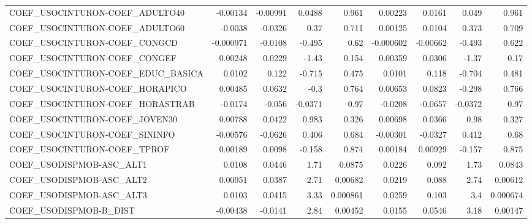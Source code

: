 \begin{tabular}{lrrrrrrrr}
COEF\_USOCINTURON-COEF\_ADULTO40    &    -0.00134 &     -0.00991 &   0.0488 &    0.961 &    0.00223 &      0.0161 &        0.049 &         0.961 \\
COEF\_USOCINTURON-COEF\_ADULTO60    &     -0.0038 &      -0.0326 &     0.37 &    0.711 &    0.00125 &      0.0104 &        0.373 &         0.709 \\
COEF\_USOCINTURON-COEF\_CONGCD      &   -0.000971 &      -0.0108 &   -0.495 &     0.62 &  -0.000602 &    -0.00662 &       -0.493 &         0.622 \\
COEF\_USOCINTURON-COEF\_CONGEF      &     0.00248 &       0.0229 &    -1.43 &    0.154 &    0.00359 &      0.0306 &        -1.37 &          0.17 \\
COEF\_USOCINTURON-COEF\_EDUC\_BASICA &      0.0102 &        0.122 &   -0.715 &    0.475 &     0.0101 &       0.118 &       -0.704 &         0.481 \\
COEF\_USOCINTURON-COEF\_HORAPICO    &     0.00485 &       0.0632 &     -0.3 &    0.764 &    0.00653 &      0.0823 &       -0.298 &         0.766 \\
COEF\_USOCINTURON-COEF\_HORASTRAB   &     -0.0174 &       -0.056 &  -0.0371 &     0.97 &    -0.0208 &     -0.0657 &      -0.0372 &          0.97 \\
COEF\_USOCINTURON-COEF\_JOVEN30     &     0.00788 &       0.0422 &    0.983 &    0.326 &    0.00698 &      0.0366 &         0.98 &         0.327 \\
COEF\_USOCINTURON-COEF\_SININFO     &    -0.00576 &      -0.0626 &    0.406 &    0.684 &   -0.00301 &     -0.0327 &        0.412 &          0.68 \\
COEF\_USOCINTURON-COEF\_TPROF       &     0.00189 &       0.0098 &   -0.158 &    0.874 &    0.00184 &     0.00929 &       -0.157 &         0.875 \\
COEF\_USODISPMOB-ASC\_ALT1          &      0.0108 &       0.0446 &     1.71 &   0.0875 &     0.0226 &       0.092 &         1.73 &        0.0843 \\
COEF\_USODISPMOB-ASC\_ALT2          &     0.00951 &       0.0387 &     2.71 &  0.00682 &     0.0219 &       0.088 &         2.74 &       0.00612 \\
COEF\_USODISPMOB-ASC\_ALT3          &      0.0103 &       0.0415 &     3.33 & 0.000861 &     0.0259 &       0.103 &          3.4 &      0.000674 \\
COEF\_USODISPMOB-B\_DIST            &    -0.00438 &      -0.0141 &     2.84 &  0.00452 &     0.0155 &      0.0546 &         3.18 &       0.00147 \\

\end{tabular}
